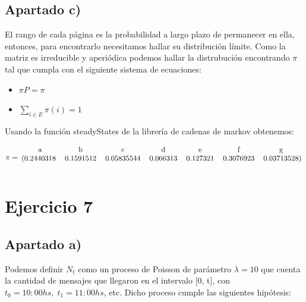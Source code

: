 \documentclass[11pt]{article}
\begin{document}

\subsection*{Apartado c)}

El rango de cada página es la probabilidad a largo plazo de permanecer en ella,
entonces, para encontrarlo necesitamos hallar su distribución límite. Como la matriz
es irreducible y aperiódica podemos hallar la distrubución encontrando
$\pi$ tal que cumpla con el siguiente sistema de ecuaciones:

\begin{itemize}
  \item $\pi P = \pi$
  \item $\displaystyle\sum_{i \in E} \pi(i) = 1$
\end{itemize}

Usando la función steadyStates de la librería de cadenas de markov obtenemos:

\begin{equation*}
  \pi = 
  \begin{blockarray}{ccccccc}
    \text{a} & \text{b} & \text{c} & \text{d} & \text{e} & \text{f} & \text{g} \\
    \begin{block}{(ccccccc)}
      0.2440318 & 0.1591512 & 0.05835544 & 0.066313 & 0.127321 & 0.3076923 & 0.03713528 \\
    \end{block}
  \end{blockarray}
\end{equation*}


\section{Ejercicio 7}

\subsection*{Apartado a)}

Podemos definir $N_t$ como un proceso de Poisson de parámetro $\lambda = 10$ que
cuenta la cantidad de mensajes que llegaron en el intervalo [0, t], con $t_0 = 10:00hs, \;
t_1 = 11:00hs$, etc. Dicho proceso cumple las siguientes hipótesis:
\end{document}
